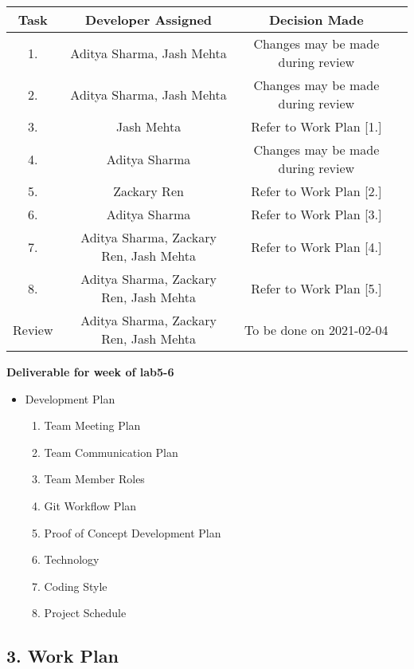 \documentclass[11pt, oneside]{article}   	%
\begin{document}
\begin{center}
\begin{tabular}{ | c | c | c | c | }
\hline
Task & Developer Assigned & Decision Made\\
\hline
1. & Aditya Sharma, Jash Mehta & Changes may be made during review \\
\hline
2. & Aditya Sharma, Jash Mehta & Changes may be made during review \\
\hline
3. & Jash Mehta & Refer to Work Plan [1.]\\
\hline
4. & Aditya Sharma & Changes may be made during review\\
\hline
5. & Zackary Ren & Refer to Work Plan [2.]\\
\hline
6. & Aditya Sharma & Refer to Work Plan [3.]\\
\hline
7. & Aditya Sharma, Zackary Ren, Jash Mehta & Refer to Work Plan [4.]\\
\hline
8. & Aditya Sharma, Zackary Ren, Jash Mehta & Refer to Work Plan [5.]\\
\hline
Review & Aditya Sharma, Zackary Ren, Jash Mehta & To be done on 2021-02-04 \\
\hline
\end{tabular}
\end{center}

\textbf{Deliverable for week of lab5-6}
\begin{itemize}
\item Development Plan
\begin{enumerate}
\item Team Meeting Plan
\item Team Communication Plan
\item Team Member Roles
\item Git Workflow Plan
\item Proof of Concept Development Plan
\item Technology
\item Coding Style
\item Project Schedule
\end{enumerate}
\end{itemize}
\newpage{}

\setlength{\headsep}{25pt}
\subsection*{3. Work Plan}
\end{document}
